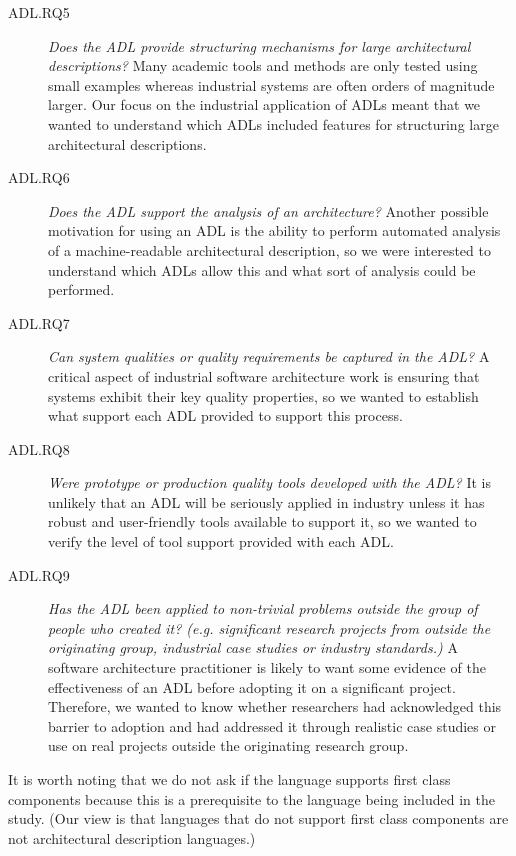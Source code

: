 \begin{description}
\item[ADL.RQ5] \emph{Does the ADL provide structuring mechanisms for large architectural descriptions?}  Many academic tools and methods are only tested using small examples whereas industrial systems are often orders of magnitude larger.  Our focus on the industrial application of ADLs meant that we wanted to understand which ADLs included features for structuring large architectural descriptions.

\item[ADL.RQ6] \emph{Does the ADL support the analysis of an architecture?}  Another possible motivation for using an ADL is the ability to perform automated analysis of a machine-readable architectural description, so we were interested to understand which ADLs allow this and what sort of analysis could be performed.

\item[ADL.RQ7] \emph{Can system qualities or quality requirements be captured in the ADL?}  A critical aspect of industrial software architecture work is ensuring that systems exhibit their key quality properties, so we wanted to establish what support each ADL provided to support this process.

\item[ADL.RQ8] \emph{Were prototype or production quality tools developed with the ADL?}  It is unlikely that an ADL will be seriously applied in industry unless it has robust and user-friendly tools available to support it, so we wanted to verify the level of tool support provided with each ADL.

\item[ADL.RQ9] \emph{Has the ADL been applied to non-trivial problems outside the group of people who created it? (e.g. significant research projects from outside the originating group, industrial case studies or industry standards.)}  A software architecture practitioner is likely to want some evidence of the effectiveness of an ADL before adopting it on a significant project.  Therefore, we wanted to know whether researchers had acknowledged this barrier to adoption and had addressed it through realistic case studies or use on real projects outside the originating research group.

\end{description}

It is worth noting that we do not ask if the language supports first class components because this is a prerequisite to the language being included in the study.  (Our view is that languages that do not support first class components are not architectural description languages.) 

